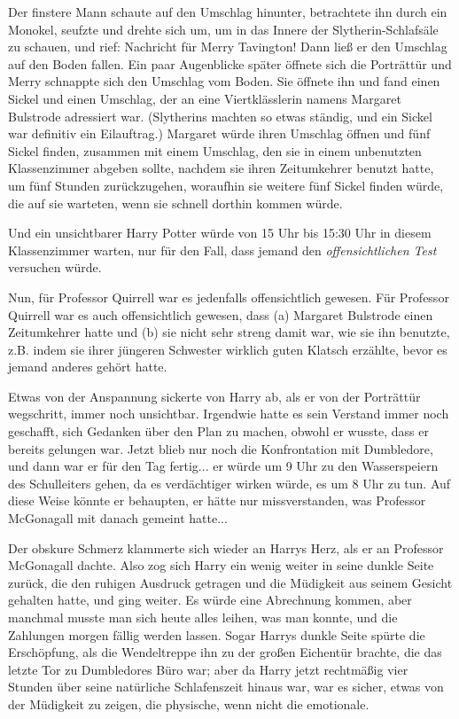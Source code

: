 Der finstere Mann schaute auf den Umschlag hinunter, betrachtete ihn durch ein
Monokel, seufzte und drehte sich um, um in das Innere der Slytherin-Schlafsäle
zu schauen, und rief: \glqq Nachricht für Merry Tavington!\grqq{} Dann ließ er
den Umschlag auf den Boden fallen. Ein paar Augenblicke später öffnete sich die
Porträttür und Merry schnappte sich den Umschlag vom Boden. Sie öffnete ihn und
fand einen Sickel und einen Umschlag, der an eine Viertklässlerin namens
Margaret Bulstrode adressiert war. (Slytherins machten so etwas ständig, und ein
Sickel war definitiv ein Eilauftrag.) Margaret würde ihren Umschlag öffnen und
fünf Sickel finden, zusammen mit einem Umschlag, den sie in einem unbenutzten
Klassenzimmer abgeben sollte, nachdem sie ihren Zeitumkehrer benutzt hatte, um
fünf Stunden zurückzugehen, woraufhin sie weitere fünf Sickel finden würde, die
auf sie warteten, wenn sie schnell dorthin kommen würde.

Und ein unsichtbarer Harry Potter würde von 15 Uhr bis 15:30 Uhr in diesem
Klassenzimmer warten, nur für den Fall, dass jemand den \emph{offensichtlichen
Test} versuchen würde.

Nun, für Professor Quirrell war es jedenfalls offensichtlich gewesen. Für
Professor Quirrell war es auch offensichtlich gewesen, dass (a) Margaret
Bulstrode einen Zeitumkehrer hatte und (b) sie nicht sehr streng damit war, wie
sie ihn benutzte, z.B. indem sie ihrer jüngeren Schwester wirklich guten Klatsch
erzählte, \glqq bevor\grqq{} es jemand anderes gehört hatte.

Etwas von der Anspannung sickerte von Harry ab, als er von der Porträttür
wegschritt, immer noch unsichtbar. Irgendwie hatte es sein Verstand immer noch
geschafft, sich Gedanken über den Plan zu machen, obwohl er wusste, dass er
bereits gelungen war. Jetzt blieb nur noch die Konfrontation mit Dumbledore, und
dann war er für den Tag fertig... er würde um 9 Uhr zu den Wasserspeiern des
Schulleiters gehen, da es verdächtiger wirken würde, es um 8 Uhr zu tun. Auf
diese Weise könnte er behaupten, er hätte nur missverstanden, was Professor
McGonagall mit \glqq danach\grqq{} gemeint hatte...

Der obskure Schmerz klammerte sich wieder an Harrys Herz, als er an Professor
McGonagall dachte. Also zog sich Harry ein wenig weiter in seine dunkle Seite
zurück, die den ruhigen Ausdruck getragen und die Müdigkeit aus seinem Gesicht
gehalten hatte, und ging weiter. Es würde eine Abrechnung kommen, aber manchmal
musste man sich heute alles leihen, was man konnte, und die Zahlungen morgen
fällig werden lassen. Sogar Harrys dunkle Seite spürte die Erschöpfung, als die
Wendeltreppe ihn zu der großen Eichentür brachte, die das letzte Tor zu
Dumbledores Büro war; aber da Harry jetzt rechtmäßig vier Stunden über seine
natürliche Schlafenszeit hinaus war, war es sicher, etwas von der Müdigkeit zu
zeigen, die physische, wenn nicht die emotionale.

